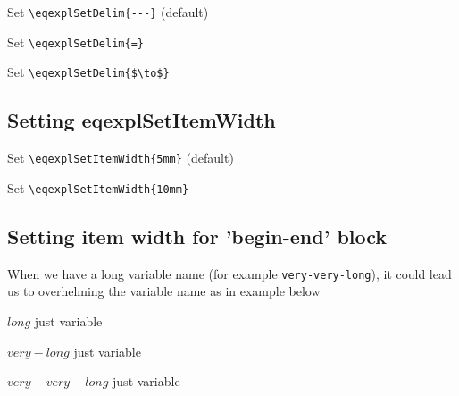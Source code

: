 \documentclass{article}
\begin{document}
\noindent Set \verb+\eqexplSetDelim{---}+ (default)

\eqexplSetDelim{---}
\begin{eqexpl}
  \testList
\end{eqexpl}

\vspace{5mm}

\noindent Set \verb+\eqexplSetDelim{=}+

\eqexplSetDelim{=}
\begin{eqexpl}
  \testList
\end{eqexpl}

\vspace{5mm}

\noindent Set \verb+\eqexplSetDelim{$\to$}+

\eqexplSetDelim{$\to$}
\begin{eqexpl}
  \testList
\end{eqexpl}

\eqexplSetDelim{---}

\subsection{Setting eqexplSetItemWidth}

\noindent Set \verb+\eqexplSetItemWidth{5mm}+ (default)

\eqexplSetItemWidth{5mm}
\begin{eqexpl}
  \testList
\end{eqexpl}

\vspace{5mm}

\noindent Set \verb+\eqexplSetItemWidth{10mm}+

\eqexplSetItemWidth{10mm}
\begin{eqexpl}
  \testList
\end{eqexpl}

\eqexplSetItemWidth{5mm}

\subsection{Setting item width for 'begin-end' block}

When we have a long variable name (for example \verb+very-very-long+),
it could lead us to overhelming the variable name as in example below

\begin{eqexpl}
  \item{$long$} just variable
  \item{$very-long$} just variable
  \item{$very-very-long$} just variable
\end{eqexpl}
\end{document}
